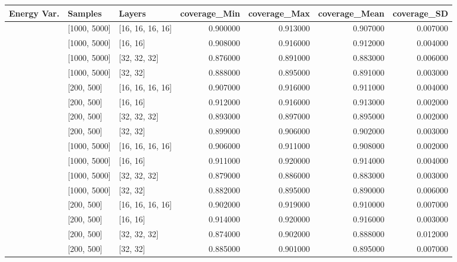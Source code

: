 \begin{tabular}{lllrrrr}
\toprule
Energy Var. & Samples & Layers & coverage_Min & coverage_Max & coverage_Mean & coverage_SD \\
\midrule
[0.001, 0.0001] & [1000, 5000] & [16, 16, 16, 16] & 0.900000 & 0.913000 & 0.907000 & 0.007000 \\
[0.001, 0.0001] & [1000, 5000] & [16, 16] & 0.908000 & 0.916000 & 0.912000 & 0.004000 \\
[0.001, 0.0001] & [1000, 5000] & [32, 32, 32] & 0.876000 & 0.891000 & 0.883000 & 0.006000 \\
[0.001, 0.0001] & [1000, 5000] & [32, 32] & 0.888000 & 0.895000 & 0.891000 & 0.003000 \\
[0.001, 0.0001] & [200, 500] & [16, 16, 16, 16] & 0.907000 & 0.916000 & 0.911000 & 0.004000 \\
[0.001, 0.0001] & [200, 500] & [16, 16] & 0.912000 & 0.916000 & 0.913000 & 0.002000 \\
[0.001, 0.0001] & [200, 500] & [32, 32, 32] & 0.893000 & 0.897000 & 0.895000 & 0.002000 \\
[0.001, 0.0001] & [200, 500] & [32, 32] & 0.899000 & 0.906000 & 0.902000 & 0.003000 \\
[0.1, 0.01] & [1000, 5000] & [16, 16, 16, 16] & 0.906000 & 0.911000 & 0.908000 & 0.002000 \\
[0.1, 0.01] & [1000, 5000] & [16, 16] & 0.911000 & 0.920000 & 0.914000 & 0.004000 \\
[0.1, 0.01] & [1000, 5000] & [32, 32, 32] & 0.879000 & 0.886000 & 0.883000 & 0.003000 \\
[0.1, 0.01] & [1000, 5000] & [32, 32] & 0.882000 & 0.895000 & 0.890000 & 0.006000 \\
[0.1, 0.01] & [200, 500] & [16, 16, 16, 16] & 0.902000 & 0.919000 & 0.910000 & 0.007000 \\
[0.1, 0.01] & [200, 500] & [16, 16] & 0.914000 & 0.920000 & 0.916000 & 0.003000 \\
[0.1, 0.01] & [200, 500] & [32, 32, 32] & 0.874000 & 0.902000 & 0.888000 & 0.012000 \\
[0.1, 0.01] & [200, 500] & [32, 32] & 0.885000 & 0.901000 & 0.895000 & 0.007000 \\
\bottomrule
\end{tabular}
